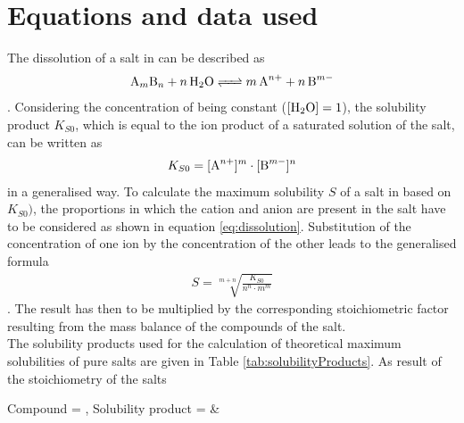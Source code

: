 \documentclass{scrartcl}
\begin{document}
\section{Equations and data used}
The dissolution of a salt in  can be described as
%
\begin{align}
	\ce{A_{m}B_{n} + n H2O <=> m A^{n+} + n B^{m-}}	
	\label{eq:dissolution}
\end{align}
%
. Considering the concentration of  being constant ($[\ce{H2O}] = 1$), the solubility product $K_{S0}$, which is equal to the ion product of a saturated solution of the salt, can be written as
%
\begin{align}
	K_{S0} = [\ce{A^{n+}}]^{m} \cdot [\ce{B^{m-}}]^{n}
\end{align}
%
in a generalised way. To calculate the maximum solubility $S$ of a salt in  based on $K_{S0})$, the proportions in which the cation and anion are present in the salt have to be considered as shown in equation \ref{eq:dissolution}. Substitution of the concentration of one ion by the concentration of the other leads to the generalised formula
%
\begin{align}
	S = \sqrt[m+n]{\frac{K_{S0}}{n^{n} \cdot m^{m}}}
\end{align}
%
. The result has then to be multiplied by the corresponding stoichiometric factor resulting from the mass balance of the compounds of the salt.\\
The solubility products used for the calculation of theoretical maximum solubilities of pure salts are given in Table \ref{tab:solubilityProducts}. 
As result of the stoichiometry of the salts
%
%
%
%
\begin{table}[!h]
	\caption{Solubility products ($K_{S0}$) of poorly soluble salts of relevant plant nutrients at \SI{25}{\degreeCelsius}.}
	\label{tab:solubilityProducts}
\vspace{5mm}
%
{Compound = \compound, Solubility product = \constant}{%
\compound & \tablenum{\constant}
}%
\end{table}
%
%
%
\end{document}
